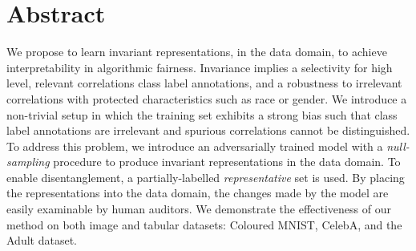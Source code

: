 %
\section*{Abstract}
%
\noindent
%
We propose to learn invariant representations, in the data domain, to achieve interpretability in
algorithmic fairness. 
%
Invariance implies a selectivity for high level, relevant correlations \wrt{} class label
annotations, and a robustness to irrelevant correlations with protected characteristics such as
race or gender. 
%
We introduce a non-trivial setup in which the training set exhibits a strong bias such that class
label annotations are irrelevant and spurious correlations cannot be distinguished. 
%
To address this problem, we introduce an adversarially trained model with a \emph{null-sampling}
procedure to produce invariant representations in the data domain.
%
To enable disentanglement, a partially-labelled \emph{representative} set is used. 
%
By placing the representations into the data domain, the changes made by the model are easily
examinable by human auditors. 
%
We demonstrate the effectiveness of our method on both image and tabular datasets: Coloured MNIST,
CelebA, and the Adult dataset.
